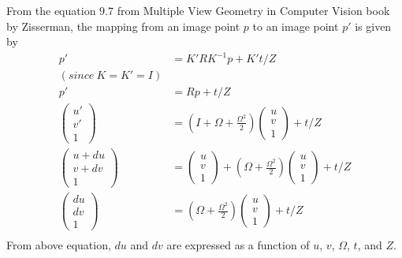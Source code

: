 \documentclass{article}
\begin{document}
From the equation $9.7$ from \cite{1} Multiple View Geometry in Computer Vision book by Zisserman, the mapping from an image point $p$ to an image point $p'$ is given by
\begin{align*}
p' &= K' R K^{-1} p + K' t/Z \\
(since\ K = K' = I) \\
p' &= R p + t/Z \\
\begin{pmatrix} u'\\ v'\\ 1 \end{pmatrix} &= ( I + \Omega + \frac{\Omega^2}{2} ) \begin{pmatrix} u\\ v\\ 1 \end{pmatrix} + t / Z \\
\begin{pmatrix} u + du\\ v + dv\\ 1 \end{pmatrix} &= \begin{pmatrix} u\\ v\\ 1 \end{pmatrix} + ( \Omega + \frac{\Omega^2}{2} ) \begin{pmatrix} u\\ v\\ 1 \end{pmatrix} + t / Z \\
\begin{pmatrix} du\\  dv\\ 1 \end{pmatrix} &= ( \Omega + \frac{\Omega^2}{2} ) \begin{pmatrix} u\\ v\\ 1 \end{pmatrix} + t / Z \\
\end{align*}
From above equation, $du$ and $dv$ are expressed as a function of $u$, $v$, $\Omega$, $t$, and $Z$.
\end{document}
